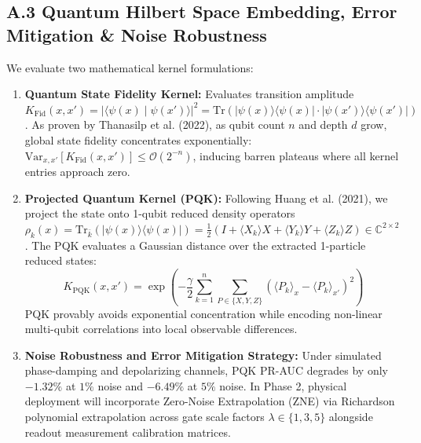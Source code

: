 \documentclass[10pt,a4paper]{article}
\begin{document}
\vspace{-8pt}

\subsection*{A.3 Quantum Hilbert Space Embedding, Error Mitigation \& Noise Robustness}
We evaluate two mathematical kernel formulations:
\begin{enumerate}[leftmargin=*,itemsep=0.3pt,topsep=0.5pt]
\item \textbf{Quantum State Fidelity Kernel:} Evaluates transition amplitude $K_{\text{Fid}}(x, x') = |\langle \psi(x) \mid \psi(x') \rangle|^2 = \mathrm{Tr}(|\psi(x)\rangle\langle\psi(x)| \cdot |\psi(x')\rangle\langle\psi(x')|)$. As proven by Thanasilp et al. (2022), as qubit count $n$ and depth $d$ grow, global state fidelity concentrates exponentially: $\mathrm{Var}_{x, x'}[K_{\text{Fid}}(x, x')] \le \mathcal{O}(2^{-n})$, inducing barren plateaus where all kernel entries approach zero.
\item \textbf{Projected Quantum Kernel (PQK):} Following Huang et al. (2021), we project the state onto 1-qubit reduced density operators $\rho_k(x) = \mathrm{Tr}_{\bar{k}}(|\psi(x)\rangle\langle\psi(x)|) = \frac{1}{2} (I + \langle X_k \rangle X + \langle Y_k \rangle Y + \langle Z_k \rangle Z) \in \mathbb{C}^{2 \times 2}$. The PQK evaluates a Gaussian distance over the extracted 1-particle reduced states:
\begin{equation}
K_{\text{PQK}}(x, x') = \exp\left( -\frac{\gamma}{2} \sum_{k=1}^n \sum_{P \in \{X, Y, Z\}} (\langle P_k \rangle_x - \langle P_k \rangle_{x'})^2 \right)
\end{equation}
PQK provably avoids exponential concentration while encoding non-linear multi-qubit correlations into local observable differences.
\item \textbf{Noise Robustness and Error Mitigation Strategy:} Under simulated phase-damping and depolarizing channels, PQK PR-AUC degrades by only $-1.32\%$ at $1\%$ noise and $-6.49\%$ at $5\%$ noise. In Phase 2, physical deployment will incorporate Zero-Noise Extrapolation (ZNE) via Richardson polynomial extrapolation across gate scale factors $\lambda \in \{1, 3, 5\}$ alongside readout measurement calibration matrices.
\end{enumerate}
\end{document}
